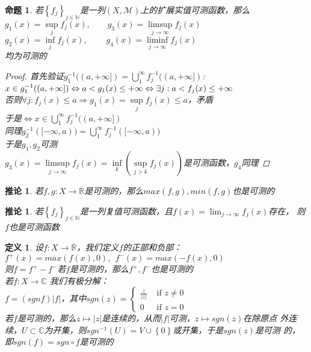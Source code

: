 \documentclass[12pt, a4paper, oneside]{ctexbook}
\newtheorem{definition}[theorem]{定义}
\newtheorem{corollary}[theorem]{推论}
\newtheorem{proposition}[theorem]{命题}
\begin{document}
\begin{proposition}
    若$\left\{f_j\right\}_{j\in\mathbb{N}}$是一列$(X,\mathcal{M})$上的扩展实值可测函数，那么\\
    $g_1(x)=\underset{j}{\sup}f_j(x),\ \ \ \ \ \ \ \ \ g_3(x)=\underset{j\to\infty}{\limsup}f_j(x)$\\
    $g_2(x)=\underset{j}{\inf}f_j(x),\ \ \ \ \ \ \ \ \ \ g_4(x)=\underset{j\to\infty}{\liminf}f_j(x)$\\
    均为可测的
    \begin{proof}
        首先验证$g_1^{-1}((a,+\infty])=\bigcup_1^{\infty}f_j^{-1}((a,+\infty])$:\\
        $x\in g^{-1}_1((a,+\infty])\Leftrightarrow a<g_1(x)\leq +\infty\\
        \Leftrightarrow \exists j: a<f_j(x)\leq +\infty$\\
        否则$\forall j:f_j(x)\leq a\Rightarrow g_1(x)=\underset{j}{\sup}f_j(x)\leq a$，矛盾\\
        于是$\Leftrightarrow x\in\bigcup_1^{\infty}f_j^{-1}((a,+\infty])$\\
        同理$g_2^{-1}([-\infty,a))=\bigcup_1^{\infty}f_j^{-1}([-\infty,a))$\\
        于是$g_1,g_2$可测\\
        $g_3(x)=\underset{j\to\infty}{\limsup}f_j(x)=\underset{k}{\inf}(\underset{j>k}{\sup}f_j(x))$是可测函数，$g_4$同理
    \end{proof}
\end{proposition}
\begin{corollary}
    若$f,g:X\to \overline{\mathbb{R}}$是可测的，那么$max(f,g),min(f,g)$也是可测的
\end{corollary}
\begin{corollary}
    若$\left\{f_j\right\}_{j\in\mathbb{N}}$是一列复值可测函数，且$f(x)=\lim_{j\to\infty}f_j(x)$存在，
    则$f$也是可测函数
\end{corollary}
\begin{definition}
    设$f:X\to\overline{\mathbb{R}}$，我们定义$f$的正部和负部：\\
    $f^{+}(x)=max(f(x),0),\ \ f^{-}(x)=max(-f(x),0)$\\
    则$f=f^{+}-f^{-}$若$f$是可测的，那么$f^{+},f^{-}$也是可测的\\
    若$f:X\to\mathbb{C}$ 我们有极分解：\\
    $f=(sgn f)|f|$，其中$sgn(z)=
    \begin{cases}
        \frac{z}{|z|}& \text{ if } z\neq 0 \\
        0& \text{ if } z=0
      \end{cases}$\\
      若$f$是可测的，那么$z\mapsto|z|$是连续的，从而$|f|$可测，$z\mapsto sgn(z)$在除原点
      外连续，$U\subset \mathbb{C}$为开集，则$sgn^{-1}(U)=V\cup\left\{0\right\}$或开集，于是$sgn(z)$是可测
      的，即$sgn(f)=sgn\circ f$是可测的
\end{definition}
\end{document}
